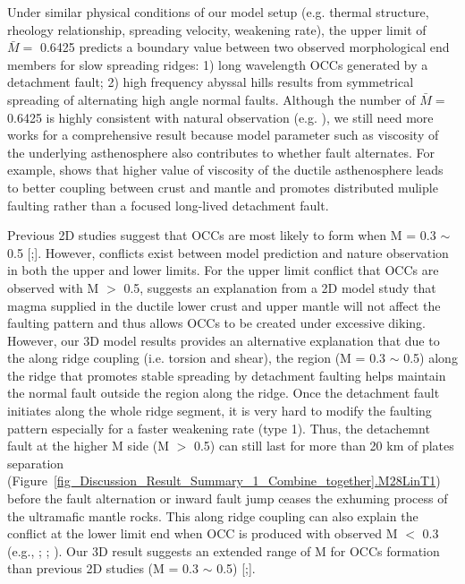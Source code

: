 Under similar physical conditions of our model setup (e.g. thermal structure, rheology relationship, spreading velocity, weakening rate), the upper limit of $\bar{M} = $ 0.6425 predicts a boundary value between two observed morphological end members for slow spreading ridges: 1) long wavelength OCCs generated by a detachment fault; 2) high frequency abyssal hills results from symmetrical spreading of alternating high angle normal faults. Although the number of $\bar{M} = $ 0.6425 is highly consistent with natural observation (e.g. \citep{MacLeod2009}), we still need more works for a comprehensive result because model parameter such as viscosity of the underlying asthenosphere also contributes to whether fault alternates. For example, \citep{Allken2012} shows that higher value of viscosity of the ductile asthenosphere leads to better coupling between crust and mantle and promotes distributed muliple faulting rather than a focused long-lived detachment fault.

Previous 2D studies suggest that OCCs are most likely to form when M = 0.3 $\sim$ 0.5 [\citealp{Buck2005};\citealp{Tucholke2008}]. However, conflicts exist between model prediction and nature observation in both the upper and lower limits. For the upper limit conflict that OCCs are observed with M $>$ 0.5, \citet{Olive2010} suggests an explanation from a 2D model study that magma supplied in the ductile lower crust and upper mantle will not affect the faulting pattern and thus allows OCCs to be created under excessive diking. However, our 3D model results provides an alternative explanation that due to the along ridge coupling (i.e. torsion and shear), the region (M = 0.3 $\sim$ 0.5) along the ridge that promotes stable spreading by detachment faulting helps maintain the normal fault outside the region along the ridge. Once the detachment fault initiates along the whole ridge segment, it is very hard to modify the faulting pattern especially for a faster weakening rate (type 1). Thus, the detachemnt fault at the higher M side (M $>$ 0.5) can still last for more than 20 km of plates separation (Figure~\hyperref[fig_Discussion_Result_Summary_1_Combine_together]{\ref{fig_Discussion_Result_Summary_1_Combine_together}.M28LinT1}) before the fault alternation or inward fault jump ceases the exhuming process of the ultramafic mantle rocks. This along ridge coupling can also explain the conflict at the lower limit end when OCC is produced with observed M $<$ 0.3 (e.g., \citealp{Dick2008}; \citealp{Grimes2008}; \citealp{Baines2008}). Our 3D result suggests an extended range of M for OCCs formation than previous 2D studies (M = 0.3 $\sim$ 0.5) [\citealp{Buck2005};\citealp{Tucholke2008}]. 



